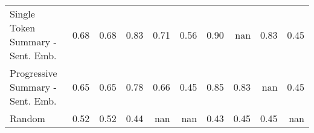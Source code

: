 \begin{tabular}{lrrrrrrrrr}
Single Token Summary - Sent. Emb. & \cellcolor[RGB]{206,217,235}0.68 & \cellcolor[RGB]{202,216,238}0.68 & \cellcolor[RGB]{246,166,135}0.83 & \cellcolor[RGB]{220,220,221}0.71 & \cellcolor[RGB]{135,170,252}0.56 & \cellcolor[RGB]{230,114,89}0.90 & \cellcolor[RGB]{0,0,0}nan & \cellcolor[RGB]{246,166,135}0.83 & \cellcolor[RGB]{69,91,205}0.45 \\
Progressive Summary - Sent. Emb. & \cellcolor[RGB]{190,211,245}0.65 & \cellcolor[RGB]{187,209,247}0.65 & \cellcolor[RGB]{244,195,171}0.78 & \cellcolor[RGB]{194,212,243}0.66 & \cellcolor[RGB]{67,90,204}0.45 & \cellcolor[RGB]{243,152,121}0.85 & \cellcolor[RGB]{246,166,135}0.83 & \cellcolor[RGB]{0,0,0}nan & \cellcolor[RGB]{69,91,205}0.45 \\
Random & \cellcolor[RGB]{108,142,241}0.52 & \cellcolor[RGB]{105,139,239}0.52 & \cellcolor[RGB]{63,83,198}0.44 & \cellcolor[RGB]{0,0,0}nan & \cellcolor[RGB]{0,0,0}nan & \cellcolor[RGB]{58,76,192}0.43 & \cellcolor[RGB]{69,91,205}0.45 & \cellcolor[RGB]{69,91,205}0.45 & \cellcolor[RGB]{0,0,0}nan \\
\bottomrule
\end{tabular}